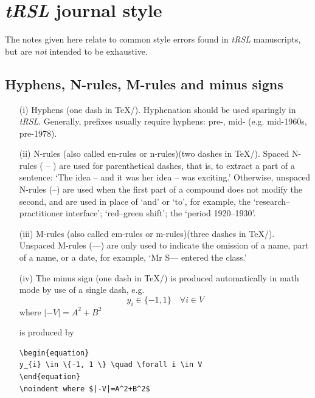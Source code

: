 \documentclass[]{tRSL2e}
\begin{document}
\section{{\textit{tRSL}} journal style}

The notes given here relate to common style errors found in  {{\it tRSL}} manuscripts, but are {\itshape not\/}
intended to be exhaustive.

\subsection{Hyphens, N-rules, M-rules and minus signs}\label{dashes}

\begin{enumerate}
\item[(i)] Hyphens (one dash in TeX/\LaTeXe). Hyphenation should be used sparingly in {\it tRSL}. Generally, prefixes usually require hyphens: pre-, mid- (e.g. mid-1960s, pre-1978).
\item[(ii)] N-rules (also called en-rules or n-rules)(two dashes in \TeX/\LaTeXe). Spaced N-rules ( -- ) are used for parenthetical dashes, that is, to extract a part of a sentence: `The idea -- and it was her idea -- was exciting.' Otherwise, unspaced N-rules (--) are used when the first part of a compound does not modify the second, and are used in place of `and' or `to', for example, the `research--practitioner interface'; `red--green shift'; the `period 1920--1930'.
\item[(iii)] M-rules (also called em-rules or m-rules)(three dashes in \TeX/\LaTeXe). Unspaced M-rules (---) are only used to indicate the omission of a name, part of a name, or a date, for example, `Mr S--- entered the class.'
\item[(iv)] The minus sign (one dash in \TeX/\LaTeXe) is produced
automatically in math mode by use of a single dash, e.g.
\begin{equation}
y_{i} \in \{-1, 1 \} \quad \forall i \in V
\end{equation}
\noindent where $|-V|=A^2+B^2$\medskip

\noindent is produced by

\begin{verbatim}
\begin{equation}
y_{i} \in \{-1, 1 \} \quad \forall i \in V
\end{equation}
\noindent where $|-V|=A^2+B^2$
\end{verbatim}

\end{enumerate}
\end{document}
